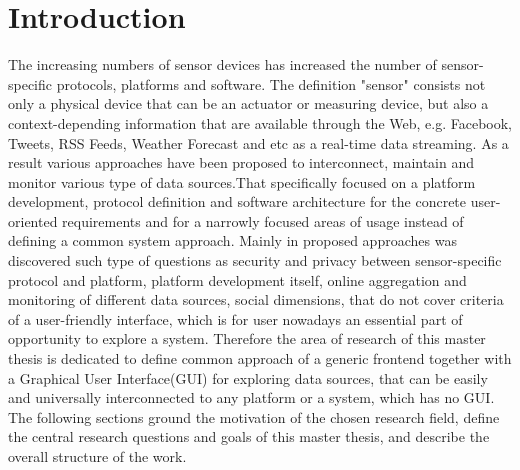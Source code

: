 
\chapter{Introduction}

  \begin{singlespace}
     The increasing numbers of sensor devices has increased the number of sensor-specific protocols, platforms and software. The definition "sensor" consists not only a physical device that can be an actuator or measuring device, but also a context-depending information that are available through the Web, e.g. Facebook, Tweets, RSS Feeds, Weather Forecast and etc as a real-time data streaming. As a result various approaches have been proposed to interconnect, maintain and monitor various type of data sources\cite{6588063,bendel2013service,song2010real}.That specifically focused on a platform development, protocol definition and software architecture for the concrete user-oriented requirements and for a narrowly focused areas of usage instead of defining a common system approach. Mainly in proposed approaches was discovered such type of questions as security and privacy between sensor-specific protocol and platform, platform development itself, online aggregation and monitoring of different data sources, social dimensions\cite{eggert2013sensorcloud}, that do not cover criteria of a user-friendly interface, which is for user nowadays an essential part of opportunity to explore a system. Therefore the area of research of this master thesis is dedicated to define common approach of a generic frontend together with a Graphical User Interface(GUI) for exploring data sources, that can be easily and universally interconnected to any platform or a system, which has no GUI. The following sections ground the motivation of the chosen research field, define the central research questions and goals of this master thesis, and describe the overall structure of the work.
  \end{singlespace}

